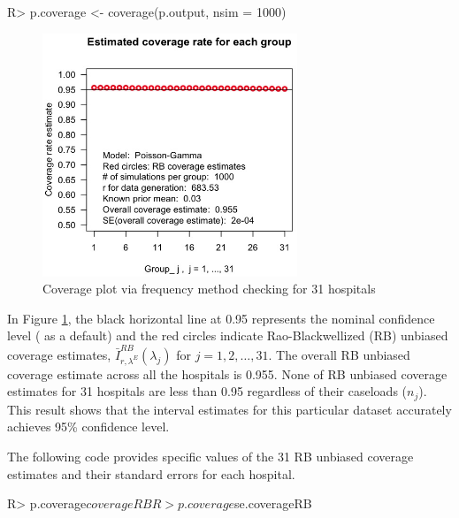 \documentclass[article]{jss}
\begin{document}
\begin{CodeChunk}
\begin{CodeInput}
R> p.coverage <- coverage(p.output, nsim = 1000)
\end{CodeInput}
\end{CodeChunk}
\begin{figure}[h] 
\begin{center}
\includegraphics[width = 3in]{hospital2.png}
\caption{Coverage plot via frequency method checking for 31 hospitals}
\label{fig:hospitalcoverage}
\end{center}
\end{figure}

In Figure \ref{fig:hospitalcoverage}, the black horizontal line at 0.95 represents the nominal confidence level ( as a default) and the red circles indicate Rao-Blackwellized (RB) unbiased coverage estimates, $\bar{I}^{RB}_{r, \lambda^E}(\lambda_j)$ for $j=1, 2, \ldots, 31$. The overall RB unbiased coverage estimate across all the hospitals is 0.955. None of RB unbiased coverage estimates for 31 hospitals are less than 0.95 regardless of their caseloads ($n_{j}$). This result shows that the interval estimates for this particular dataset accurately achieves 95\% confidence level. 


The following code provides specific values of the 31 RB unbiased coverage estimates and their standard errors for each hospital.
\begin{CodeChunk}
\begin{CodeInput}
R> p.coverage$coverageRB
R> p.coverage$se.coverageRB
\end{CodeInput}
\end{CodeChunk}
\end{document}
